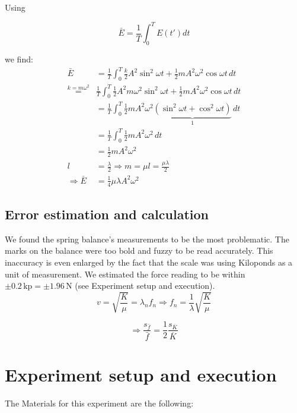 \documentclass{scrreprt}
\newcommand{\unit}[1]{\ensuremath{\, \mathrm{#1}}}
\begin{document}
Using

\begin{equation}
\bar{E} = \frac{1}{T} \int_0^T{E(t') dt}
\end{equation}

we find:
\begin{align}
\bar{E} &= \frac{1}{T} \int_0^T{\frac{k}{2} A^2 \sin^2{\omega t} + \frac{1}{2} m A^2 \omega^2 \cos{\omega t}}\,dt\\
\stackrel{k=m\omega^2}{=}& \frac{1}{T} \int_0^T{\frac{1}{2} A^2 m \omega^2 \sin^2{\omega t} + \frac{1}{2} m A^2 \omega^2 \cos{\omega t}} \,dt\\
&= \frac{1}{T}\int_0^T{\frac{1}{2} m A^2 \omega^2 \underbrace{(\sin^2{\omega t}+\cos^2{\omega t})}_{1} } \,dt\\
& = \frac{1}{T}\int_0^T \! \frac{1}{2}mA^2\omega^2 \, dt\\
& =\frac{1}{2}mA^2\omega^2\\
l &= \frac{\lambda}{2} \Rightarrow m = \mu l = \frac{\mu \lambda}{2}\\ 
\Rightarrow \bar{E} &= \frac{1}{4}\mu \lambda A^2\omega^2
\end{align}

\subsection{Error estimation and calculation}
We found the spring balance's measurements to be the most problematic. The marks on the balance were too bold and fuzzy to be read accurately. This inaccuracy is even enlarged by the fact that the scale was using Kiloponds as a unit of measurement. We estimated the force reading to be within $\pm 0.2\unit{kp} = \pm 1.96 \unit{N}$ (see Experiment setup and execution).\\

\begin{equation}
v = \sqrt{\frac{K}{\mu}} = \lambda_n f_n \Rightarrow f_n = \frac{1}{\lambda} \sqrt{\frac{K}{\mu}} 
\end{equation}

\begin{equation}
\Rightarrow \frac{s_{\bar{f}}}{\bar{f}} = \frac{1}{2} \frac{s_{\overline{K}}}{\overline{K}}
\end{equation}

\section{Experiment setup and execution}
The Materials for this experiment are the following: 
\end{document}
